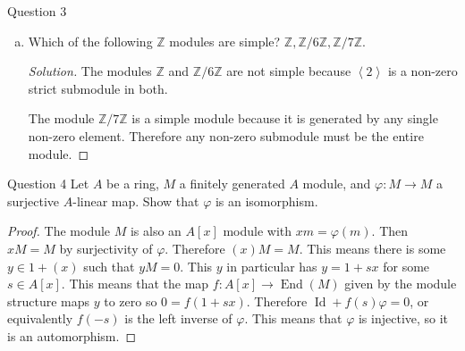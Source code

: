 \documentclass{article}
\newcommand{\Z}{\mathbb{Z}}
\DeclareMathOperator{\Id}{Id}
\DeclareMathOperator{\End}{End}
\newcommand{\gen}[1]{\left<#1\right>}
\newenvironment{question}[1][]{\begin{paragraph}{Question #1}}{\end{paragraph}}
\newenvironment{solution}{\begin{proof}[Solution]\renewcommand\qedsymbol{}}{\end{proof}}
\theoremstyle{definition}
\begin{document}
\begin{question}[3]
\begin{enumerate}[(a)]
        \item Which of the following \(\Z\) modules are simple?
              \(\Z,\Z/6\Z,\Z/7\Z\).

              \begin{solution}
                  The modules \(\Z\) and \(\Z/6\Z\) are not simple because
                  \(\gen{2}\) is a non-zero strict submodule in both.

                  The module \(\Z/7\Z\) is a simple module because it is
                  generated by any single non-zero element. Therefore any
                  non-zero submodule must be the entire module.
              \end{solution}
    \end{enumerate}
\end{question}

\begin{question}[4]
    Let \(A\) be a ring, \(M\) a finitely generated \(A\) module, and
    \(\varphi:M\to M\) a surjective \(A\)-linear map. Show that \(\varphi\) is
    an isomorphism.

    \begin{proof}
        The module \(M\) is also an \(A[x]\) module with \(xm=\varphi(m)\). Then
        \(xM=M\) by surjectivity of \(\varphi\). Therefore \((x)M=M\). This
        means there is some \(y\in 1+(x)\) such that \(yM=0\).  This \(y\) in
        particular has \(y=1+sx\) for some \(s\in A[x]\). This means that the
        map \(f:A[x]\to\End(M)\) given by the module structure maps \(y\) to
        zero so \(0=f(1+sx)\). Therefore \(\Id + f(s)\varphi=0\), or
        equivalently \(f(-s)\) is the left inverse of \(\varphi\). This means
        that \(\varphi\) is injective, so it is an automorphism.
    \end{proof}
\end{question}
\end{document}
